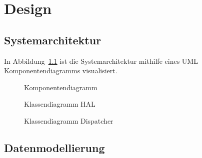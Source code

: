 \chapter{Design}\label{ch:design}



\section{Systemarchitektur}\label{sec:systemarchitektur}


In Abbildung~\ref{fig:cmp} ist die Systemarchitektur mithilfe eines UML Komponentendiagramms
visualisiert.

\begin{figure}[h]
    \centering
    \caption{Komponentendiagramm}
    \label{fig:cmp}
\end{figure}

\begin{figure}
    \caption{Klassendiagramm HAL}
    \label{fig:cd-hal}
\end{figure}

\begin{figure}
    \caption{}
    \label{fig:cd-hal-sens}
\end{figure}

\begin{figure}
    \caption{Klassendiagramm Dispatcher}
    \label{fig:cd-dispatcher}
\end{figure}


\section{Datenmodellierung}\label{sec:datenmodellierung}

